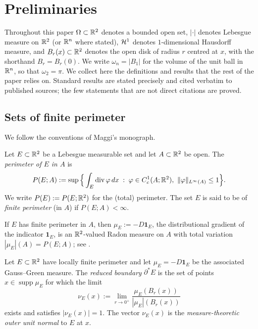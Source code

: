 \section{Preliminaries}\label{sec:prelim}

Throughout this paper $\Omega\subset\mathbb{R}^2$ denotes a bounded open set, $|\cdot|$
denotes Lebesgue measure on $\mathbb{R}^2$ (or $\mathbb{R}^n$ where stated), $\mathcal{H}^1$ denotes
$1$-dimensional Hausdorff measure, and $B_r(x)\subset\mathbb{R}^2$ denotes the open
disk of radius $r$ centred at $x$, with the shorthand $B_r=B_r(0)$. We write
$\omega_n=|B_1|$ for the volume of the unit ball in $\mathbb{R}^n$, so that
$\omega_2=\pi$. We collect here the definitions and results that the rest of
the paper relies on. Standard results are stated precisely and cited verbatim
to published sources; the few statements that are not direct citations are
proved.

\subsection{Sets of finite perimeter}\label{ss:perimeter}

We follow the conventions of Maggi's monograph.

\begin{definition}[Perimeter]\label{def:perimeter}
Let $E\subset\mathbb{R}^2$ be a Lebesgue measurable set and let $A\subset\mathbb{R}^2$ be
open. The \emph{perimeter of $E$ in $A$} is
\[
  P(E;A):=\sup\Big\{\int_E \operatorname{div}\varphi\,dx
    \;:\;\varphi\in C^1_c(A;\mathbb{R}^2),\ \|\varphi\|_{L^\infty(A)}\le 1\Big\}.
\]
We write $P(E):=P(E;\mathbb{R}^2)$ for the (total) perimeter. The set $E$ is said to
be of \emph{finite perimeter} (in $A$) if $P(E;A)<\infty$.
\end{definition}

If $E$ has finite perimeter in $A$, then $\mu_E:=-D\mathbf 1_E$, the
distributional gradient of the indicator $\mathbf 1_E$, is an $\mathbb{R}^2$-valued
Radon measure on $A$ with total variation $|\mu_E|(A)=P(E;A)$; see
\cite[Proposition~12.1 and Definition~12.1]{Maggi2012}.

\begin{definition}\label{def:reduced-boundary}
Let $E\subset\mathbb{R}^2$ have locally finite perimeter and let $\mu_E=-D\mathbf 1_E$
be the associated Gauss--Green measure. The \emph{reduced boundary}
$\partial^*E$ is the set of points $x\in\operatorname{supp}\mu_E$ for which the
limit
\[
  \nu_E(x):=\lim_{r\to0^+}\frac{\mu_E(B_r(x))}{|\mu_E|(B_r(x))}
\]
exists and satisfies $|\nu_E(x)|=1$. The vector $\nu_E(x)$ is the
\emph{measure-theoretic outer unit normal} to $E$ at $x$.
\end{definition}


